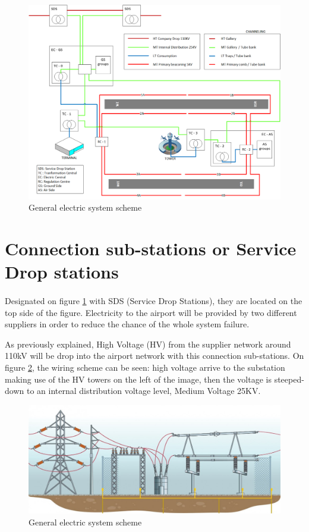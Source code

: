 	\begin{figure}[H]
		\centering
		\includegraphics[clip, trim=0cm 0cm 0cm 0cm, width=1.15\textwidth]{./images/electric/esquema_electrico}
		\caption{General electric system scheme}
		\label{electricScheme}
	\end{figure}
	
		
	\section{Connection sub-stations or Service Drop stations}
	\paragraph{} Designated on figure \ref{electricScheme} with SDS (Service Drop Stations), they are located on the top side of the figure. Electricity to the airport will be provided by two different suppliers in order to reduce the chance of the whole system failure.
	
	As previously explained, High Voltage (HV) from the supplier network around 110kV will be drop into the airport network with this connection sub-stations. On figure \ref{substation}, the wiring scheme can be seen: high voltage arrive to the substation making use of the HV towers on the left of the image, then the voltage is steeped-down to an internal distribution voltage level, Medium Voltage 25KV.

	\begin{figure}[H]
		\centering
		\includegraphics[clip, trim=0cm 0cm 0cm 0cm, width=1.15\textwidth]{./images/electric/substation}
		\caption{General electric system scheme}
		\label{substation}
	\end{figure}
	

